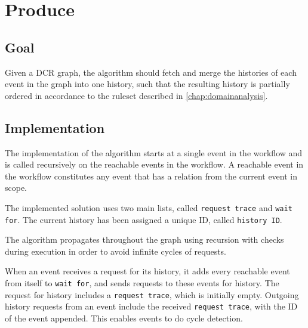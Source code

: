 \section{Produce}
\subsection{Goal} %
Given a DCR graph, the algorithm should fetch and merge the histories of each event in the graph into one history, such that the resulting history is partially ordered in accordance to the ruleset described in \autoref{chap:domainanalysis}. 


\subsection{Implementation} %
The implementation of the algorithm starts at a single event in the workflow and is called recursively on the reachable events in the workflow. A reachable event in the workflow constitutes any event that has a relation from the current event in scope.  \bigskip

The implemented solution uses two main lists, called \texttt{request trace} and \texttt{wait for}. The current history has been assigned a unique ID, called \texttt{history ID}.

The algorithm propagates throughout the graph using recursion with checks during execution in order to avoid infinite cycles of requests. \bigskip

When an event receives a request for its history, it adds every reachable event from itself to \texttt{wait for}, and sends requests to these events for history. The request for history includes a \texttt{request trace}, which is initially empty. Outgoing history requests from an event include the received \texttt{request trace}, with the ID of the event appended. This enables events to do cycle detection. \bigskip


